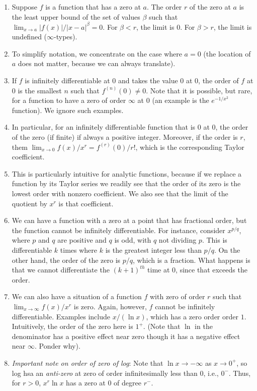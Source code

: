 \documentclass[10pt]{amsart}
\begin{document}
\begin{enumerate}
\item Suppose $f$ is a function that has a zero at $a$. The order $r$
  of the zero at $a$ is the least upper bound of the set of values
  $\beta$ such that $\lim_{x \to a} |f(x)|/|x - a|^\beta = 0$. For
  $\beta < r$, the limit is $0$. For $\beta > r$, the limit is
  undefined ($\infty$-types).
\item To simplify notation, we concentrate on the case where $a = 0$
  (the location of $a$ does not matter, because we can always translate).
\item If $f$ is infinitely differentiable at $0$ and takes the value
  $0$ at $0$, the order of $f$ at $0$ is the smallest $n$ such that
  $f^{(n)}(0) \ne 0$. Note that it is possible, but rare, for a
  function to have a zero of order $\infty$ at $0$ (an example is the
  $e^{-1/x^2}$ function). We ignore such examples.
\item In particular, for an infinitely differentiable function that is
  $0$ at $0$, the order of the zero (if finite) if always a positive
  integer. Moreover, if the order is $r$, them $\lim_{x \to 0}
  f(x)/x^r = f^{(r)}(0)/r!$, which is the corresponding Taylor
  coefficient.
\item This is particularly intuitive for analytic functions, because
  if we replace a function by its Taylor series we readily see that
  the order of its zero is the lowest order with nonzero
  coefficient. We also see that the limit of the quotient by $x^r$ is
  that coefficient.
\item We can have a function with a zero at a point that has
  fractional order, but the function cannot be infinitely
  differentiable. For instance, consider $x^{p/q}$, where $p$ and $q$
  are positive and $q$ is odd, with $q$ not dividing $p$. This is
  differentiable $k$ times where $k$ is the greatest integer less than
  $p/q$. On the other hand, the order of the zero is $p/q$, which is a
  fraction. What happens is that we cannot differentiate the
  $(k+1)^{th}$ time at $0$, since that exceeds the order.
\item We can also have a situation of a function $f$ with zero of
  order $r$ such that $\lim_{x \to \infty} f(x)/x^r$ is zero. Again,
  however, $f$ cannot be infinitely differentiable. Examples include
  $x/(\ln x)$, which has a zero order order $1$. Intuitively, the
  order of the zero here is $1^+$. (Note that $\ln$ in the denominator
  has a positive effect near zero though it has a negative effect near
  $\infty$. Ponder why).
\item {\em Important note on order of zero of log}: Note that $\ln x
  \to -\infty$ as $x \to 0^+$, so log hsa an {\em anti-zero} at zero
  of order infinitesimally less than $0$, i.e., $0^-$. Thus, for $r >
  0$, $x^r \ln x$ has a zero at $0$ of degree $r^-$.


\end{enumerate}
\end{document}
